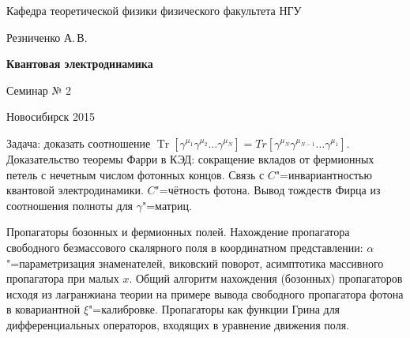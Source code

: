 \documentclass[12pt,pagesize,paper=192mm:108mm]{scrbook}
\DeclareMathOperator{\Tr}{Tr}
\begin{document}
\begin{titlepage}
\begin{center}
    Кафедра теоретической физики физического факультета НГУ
    \medskip

    \Large
    Резниченко А.\,В.
    \bigskip

    \huge
    \textbf{Квантовая электродинамика}
    \bigskip

    \Large
    Семинар № 2
    \vfill

    \normalsize
    \vfill

    \normalsize \ccbysa\hspace{0.5em}  Новосибирск 2015
  \end{center}
\end{titlepage}
\newpage

\vspace*{-1em}
\begin{center}
\vfill
  \begin{minipage}{0.7\linewidth}

    Задача: доказать соотношение
    $\Tr[\gamma^{\mu_1}\gamma^{\mu_2}\ldots\gamma^{\mu_N}]=
    Tr[\gamma^{\mu_N}\gamma^{\mu_{N-1}}\ldots\gamma^{\mu_1}]$.
    Доказательство теоремы Фарри в КЭД: сокращение вкладов от
    фермионных петель с нечетным числом фотонных концов. Связь с
    $C$"=инвариантностью квантовой электродинамики. $C$"=чётность
    фотона.  Вывод тождеств Фирца из соотношения полноты для
    $\gamma$"=матриц.
    \smallskip

    Пропагаторы бозонных и фермионных полей.  Нахождение пропагатора
    свободного безмассового скалярного поля в координатном
    представлении: $\alpha$"=параметризация знаменателей, виковский
    поворот, асимптотика массивного пропагатора при малых $x$.  Общий
    алгоритм нахождения (бозонных) пропагаторов исходя из лагранжиана
    теории на примере вывода свободного пропагатора фотона в
    ковариантной $\xi$"=калибровке. Пропагаторы как функции Грина для
    дифференциальных операторов, входящих в уравнение движения поля.
  \end{minipage}
  \vfill

\end{center}
\end{document}
